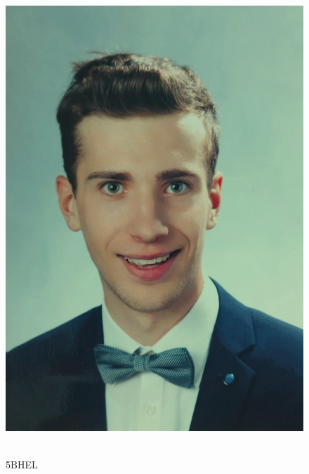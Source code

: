 \begin{figure}[h]
  \centering
  \begin{adjustbox}{valign=c}
    \includegraphics[scale=0.11]{image/Julius.jpg}
  \end{adjustbox}
  \hfill
  \begin{minipage}[b]{0.7\textwidth}
    \textbf{\nameJS} \\ 5BHEL
  \end{minipage}
  \captionsetup{justification=raggedright,singlelinecheck=false}
  \caption{\nameJS}
\end{figure}
\newpage
